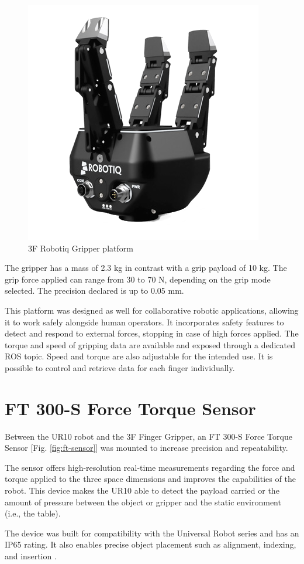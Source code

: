 \begin{figure}
	\centering
	\includegraphics[width=0.5\linewidth]{Images/gripper3f.png}
	\caption{3F Robotiq Gripper platform}
	\label{fig:gripper3f}
\end{figure}

The gripper has a mass of 2.3 kg in contrast with a grip payload of 10 kg. The grip force applied can range from 30 to 70 N, depending on the grip mode selected. The precision declared is up to 0.05 mm.

This platform was designed as well for collaborative robotic applications, allowing it to work safely alongside human operators. It incorporates safety features to detect and respond to external forces, stopping in case of high forces applied. The torque and speed of gripping data are available and exposed through a dedicated ROS topic. Speed and torque are also adjustable for the intended use. It is possible to control and retrieve data for each finger individually. 



\section{FT 300-S Force Torque Sensor}
Between the UR10 robot and the 3F Finger Gripper, an FT 300-S Force Torque Sensor [Fig. \ref{fig:ft-sensor}] was mounted to increase precision and repeatability. 

The sensor offers high-resolution real-time measurements regarding the force and torque applied to the three space dimensions and improves the capabilities of the robot. This device makes the UR10 able to detect the payload carried or the amount of pressure between the object or gripper and the static environment (i.e., the table). 

The device was built for compatibility with the Universal Robot series and has an IP65 rating. It also enables precise object placement such as alignment, indexing, and insertion \cite{url:ftsensor}. 

